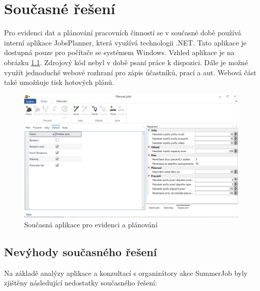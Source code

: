 \chapter{Současné řešení}

Pro evidenci dat a plánování pracovních činností se v současné době používá interní aplikace JobsPlanner, která využívá technologii .NET. Tato aplikace je dostupná pouze pro počítače se systémem
Windows. Vzhled aplikace je na obrázku \ref{fig:oldplanner}. Zdrojový kód nebyl v době psaní práce k dispozici. Dále je možné využít jednoduché webové rozhraní pro zápis účastníků, prací a aut. Webová část také umožňuje tisk hotových plánů.

\begin{figure}[h]
    \centering
    \includegraphics[width=\textwidth]{chapters/images/oldplanner}
    \caption{Současná aplikace pro evidenci a plánování}
    \label{fig:oldplanner}
\end{figure}

\section{Nevýhody současného řešení}

Na základě analýzy aplikace a konzultací s organizátory akce SummerJob byly zjištěny následující nedostatky současného řešení:

